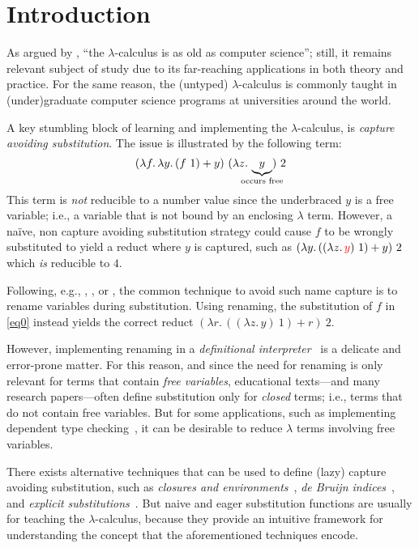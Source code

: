 \section{Introduction}

As argued by \citet{Accattoli19}, ``the $\lambda$-calculus is as old as computer science''; still, it remains relevant subject of study due to its far-reaching applications in both theory and practice.
For the same reason, the (untyped) $\lambda$-calculus is commonly taught in (under)graduate computer science programs at universities around the world.

A key stumbling block of learning and implementing the $\lambda$-calculus, is \emph{capture avoiding substitution}.
The issue is illustrated by the following term:
\begin{equation}
  (\lambda f .\, \lambda y .\, (f\ 1) + y)\ (\lambda z .\, \underbrace{y}_{\mathclap{\text{occurs free}}})\ 2
  \label{eq0}
\end{equation}
This term is \emph{not} reducible to a number value since the underbraced $y$ is a free variable; i.e., a variable that is not bound by an enclosing $\lambda$ term.
However, a na\"{i}ve, non capture avoiding substitution strategy could cause $f$ to be wrongly substituted to yield a reduct where $y$ is captured, such as $(\lambda y .\, ((\lambda z .\, {\color{red}{y}})\ 1) + y)\ 2$ which \emph{is} reducible to $4$.

Following, e.g., \citet{curry1958combinatory}, \citet{Plotkin75}, or \citet{DBLP:books/daglib/0067558}, the common technique to avoid such name capture is to rename variables during substitution.
Using renaming, the substitution of $f$ in \cref{eq0} instead yields the correct reduct $(\lambda r .\, ((\lambda z .\, y)\ 1) + r)\ 2$.

However, implementing renaming in a \emph{definitional interpreter}~\citep{reynolds98definitional} is a delicate and error-prone matter.
For this reason, and since the need for renaming is only relevant for terms that contain \emph{free variables}, educational texts---and many research papers---often define substitution only for \emph{closed} terms; i.e., terms that do not contain free variables.
But for some applications, such as implementing dependent type checking~\citep{Pareto1995ALF}, it can be desirable to reduce $\lambda$ terms involving free variables.

There exists alternative techniques that can be used to define (lazy) capture avoiding substitution, such as \emph{closures and environments}~\citep{Landin64}, \emph{de Bruijn indices}~\citep{de_Bruijn_1972}, and \emph{explicit substitutions}~\citep{AbadiCCL91}.
But naive and eager substitution functions are usually for teaching the $\lambda$-calculus, because they provide an intuitive framework for understanding the concept that the aforementioned techniques encode.

